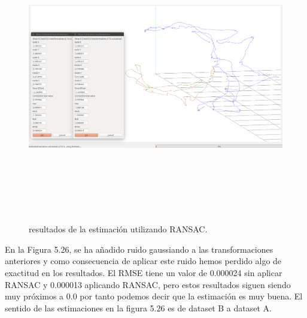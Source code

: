 \begin{figure}
\begin{center}
\label{fig:opciones de View}\includegraphics[height=12.0cm,width=18.0cm]{img/cap6/newData_EscalaTraslaRotaGauss_ba.png}
\hspace{0.5cm}

\end{center}

\caption{ resultados de la estimación  utilizando RANSAC.}
\end{figure}

En la Figura 5.26, se ha añadido ruido gaussiando a las transformaciones anteriores y como consecuencia de aplicar este ruido hemos perdido algo de exactitud en los resultados.
El RMSE tiene un valor de 0.000024 sin aplicar RANSAC y 0.000013 aplicando RANSAC, pero estos resultados siguen siendo muy próximos a 0.0 por tanto podemos decir que la estimación es muy buena.
El sentido de las estimaciones en la figura 5.26 es de dataset B a dataset A.


